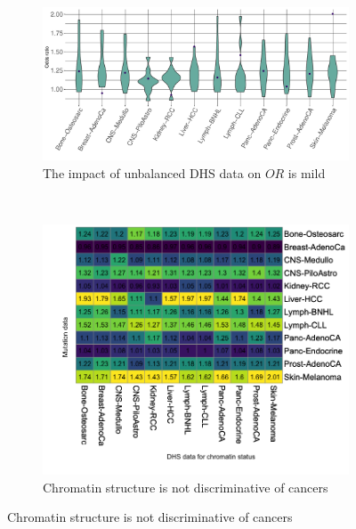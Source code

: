 \begin{figure}[htbp]
    \begin{subfigure}{\textwidth}
    \centering
    \includegraphics[scale=0.55]{graphics/mixed_or_violin.pdf}
    \caption{The impact of unbalanced DHS data on $OR$ is mild}
    \label{fig:mixed_or_violin}
    \end{subfigure} \\
    
    \vspace{0.2cm}
    \begin{subfigure}{\textwidth}
    \centering
    \includegraphics[scale=0.6]{graphics/or_mixed_heatmap.png}
    \caption{Chromatin structure is not discriminative of cancers}
    \label{fig:mixed_or_heatmap}
    \end{subfigure} 


\end{figure}
